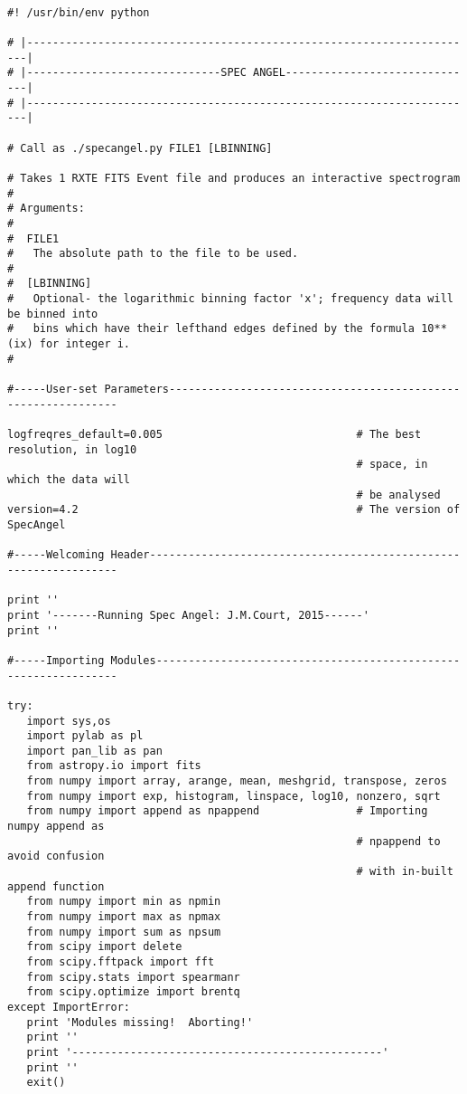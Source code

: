 \begin{verbatim}

#! /usr/bin/env python

# |----------------------------------------------------------------------|
# |------------------------------SPEC ANGEL------------------------------|
# |----------------------------------------------------------------------|

# Call as ./specangel.py FILE1 [LBINNING]

# Takes 1 RXTE FITS Event file and produces an interactive spectrogram
#
# Arguments:
#
#  FILE1
#   The absolute path to the file to be used.
#
#  [LBINNING]
#   Optional- the logarithmic binning factor 'x'; frequency data will be binned into 
#   bins which have their lefthand edges defined by the formula 10**(ix) for integer i.
#

#-----User-set Parameters--------------------------------------------------------------

logfreqres_default=0.005                              # The best resolution, in log10
                                                      # space, in which the data will
                                                      # be analysed
version=4.2                                           # The version of SpecAngel

#-----Welcoming Header-----------------------------------------------------------------

print ''
print '-------Running Spec Angel: J.M.Court, 2015------'
print ''

#-----Importing Modules----------------------------------------------------------------

try:
   import sys,os
   import pylab as pl
   import pan_lib as pan
   from astropy.io import fits
   from numpy import array, arange, mean, meshgrid, transpose, zeros
   from numpy import exp, histogram, linspace, log10, nonzero, sqrt
   from numpy import append as npappend               # Importing numpy append as
                                                      # npappend to avoid confusion
                                                      # with in-built append function
   from numpy import min as npmin
   from numpy import max as npmax
   from numpy import sum as npsum
   from scipy import delete
   from scipy.fftpack import fft
   from scipy.stats import spearmanr
   from scipy.optimize import brentq
except ImportError:
   print 'Modules missing!  Aborting!'
   print ''
   print '------------------------------------------------'
   print ''
   exit()


\end{verbatim}
